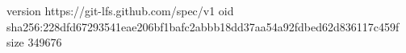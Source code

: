 version https://git-lfs.github.com/spec/v1
oid sha256:228dfd67293541eae206bf1bafc2abbb18dd37aa54a92fdbed62d836117c459f
size 349676
